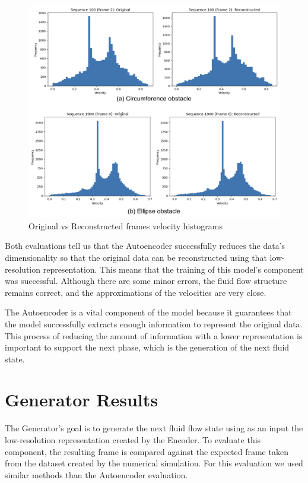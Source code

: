 \begin{figure}[H]
    \centering
    \includegraphics[width=1\linewidth]{images/autoencoder_histogram.png}
    \caption{Original vs Reconstructed frames velocity histograms}
    \label{fig:ReconstructedHistograms}
\end{figure}

Both evaluations tell us that the Autoencoder successfully reduces the data's dimensionality so that the original data can be reconstructed using that low-resolution representation. This means that the training of this model's component was successful. Although there are some minor errors, the fluid flow structure remains correct, and the approximations of the velocities are very close.

The Autoencoder is a vital component of the model because it guarantees that the model successfully extracts enough information to represent the original data. This process of reducing the amount of information with a lower representation is important to support the next phase, which is the generation of the next fluid state.

\section{Generator Results}
\label{sec:GeneratorResults}

The Generator's goal is to generate the next fluid flow state using as an input the low-resolution representation created by the Encoder. To evaluate this component, the resulting frame is compared against the expected frame taken from the dataset created by the numerical simulation. For this evaluation we used similar methods than the Autoencoder evaluation.

